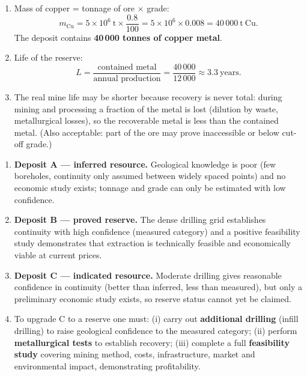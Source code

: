 \documentclass[11pt]{article}
\begin{document}
\begin{corrige}
\begin{enumerate}
\item Mass of copper = tonnage of ore $\times$ grade:
\[ m_{\mathrm{Cu}} = 5\times10^{6}\ \mathrm{t} \times \frac{0.8}{100} = 5\times10^{6}\times 0.008 = 40\,000\ \mathrm{t\ Cu}. \]
The deposit contains \textbf{40\,000 tonnes of copper metal}.
\item Life of the reserve:
\[ L = \frac{\text{contained metal}}{\text{annual production}} = \frac{40\,000}{12\,000} \approx 3.3\ \text{years}. \]
\item The real mine life may be shorter because recovery is never total: during mining and processing a fraction of the metal is lost (dilution by waste, metallurgical losses), so the recoverable metal is less than the contained metal. (Also acceptable: part of the ore may prove inaccessible or below cut-off grade.)
\end{enumerate}
\end{corrige}

\begin{corrige}
\begin{enumerate}
\item \textbf{Deposit A — inferred resource.} Geological knowledge is poor (few boreholes, continuity only assumed between widely spaced points) and no economic study exists; tonnage and grade can only be estimated with low confidence.
\item \textbf{Deposit B — proved reserve.} The dense drilling grid establishes continuity with high confidence (measured category) and a positive feasibility study demonstrates that extraction is technically feasible and economically viable at current prices.
\item \textbf{Deposit C — indicated resource.} Moderate drilling gives reasonable confidence in continuity (better than inferred, less than measured), but only a preliminary economic study exists, so reserve status cannot yet be claimed.
\item To upgrade C to a reserve one must: (i) carry out \textbf{additional drilling} (infill drilling) to raise geological confidence to the measured category; (ii) perform \textbf{metallurgical tests} to establish recovery; (iii) complete a full \textbf{feasibility study} covering mining method, costs, infrastructure, market and environmental impact, demonstrating profitability.
\end{enumerate}
\end{corrige}
\end{document}
